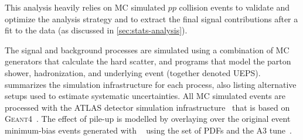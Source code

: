 This analysis heavily relies on MC simulated $pp$ collision events to validate and optimize the analysis strategy and to extract the final signal contributions after a fit to the data (as discussed in \cref{sec:stats-analysis}).

The signal and background processes are simulated using a combination of MC generators that calculate the hard scatter, and programs that model the parton shower, hadronization, and underlying event (together denoted UEPS).
 summarizes the simulation infrastructure for each process, also listing alternative setups used to estimate systematic uncertainties.
All MC simulated events are processed with the ATLAS detector simulation infrastructure~\cite{SOFT-2010-01} that is based on \textsc{Geant4}~\cite{Agostinelli:2002hh}.
The effect of pile-up is modelled by overlaying over the original event minimum-bias events generated with ~\cite{Sjostrand:2007gs} using the \nnpdftwo set of PDFs and the A3 tune~\cite{ATL-PHYS-PUB-2016-017}.


